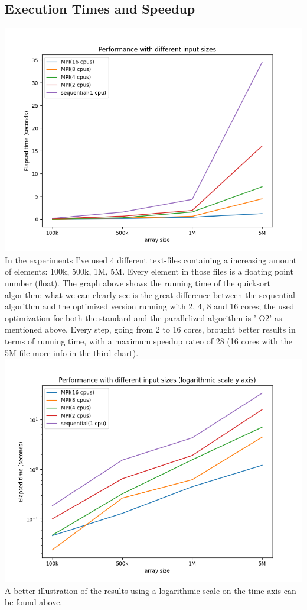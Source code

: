 \documentclass{article}
\begin{document}
\subsection*{Execution Times and Speedup}
\includegraphics[scale=.6]{inputsChart.png}
In the experiments I've used 4 different text-files containing a increasing amount of elements: 
100k, 500k, 1M, 5M. Every element in those files is a floating point number (float). The graph 
above shows the running time of the quicksort algorithm: what we can clearly see is the great 
difference between the sequential algorithm and the optimized version running with 2, 4, 8 and 16 
cores; the used optimization for both the standard and the parallelized algorithm is '-O2' as 
mentioned above. Every step, going from 2 to 16 cores, brought better results in terms of running 
time, with a maximum speedup rateo of 28 (16 cores with the 5M file more info in the third chart).  \\

\includegraphics[scale=.6]{inputsChartLog.png}
A better illustration of the results using a logarithmic scale on the time axis
can be found above.
\end{document}
